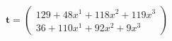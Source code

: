 \documentclass[preview]{standalone}
\begin{document}
\begin{align*}
\mathbf{t} = \begin{pmatrix}129 + 48x^{1} + 118x^{2} + 119x^{3} \\ 36 + 110x^{1} + 92x^{2} + 9x^{3}\end{pmatrix}
\end{align*}
\end{document}
